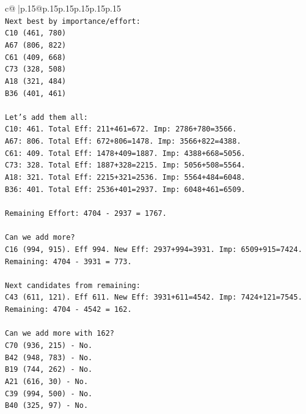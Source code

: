 \documentclass{article}
\begin{document}
{\begin{supertabular}{c@{$\;$}|p{.15\linewidth}@{}p{.15\linewidth}p{.15\linewidth}p{.15\linewidth}p{.15\linewidth}p{.15\linewidth}}
{{{\\ 
\texttt{Next best by importance/effort:} \\
\texttt{C10 (461, 780)} \\
\texttt{A67 (806, 822)} \\
\texttt{C61 (409, 668)} \\
\texttt{C73 (328, 508)} \\
\texttt{A18 (321, 484)} \\
\texttt{B36 (401, 461)} \\
\\ 
\texttt{Let's add them all:} \\
\texttt{C10: 461. Total Eff: 211+461=672. Imp: 2786+780=3566.} \\
\texttt{A67: 806. Total Eff: 672+806=1478. Imp: 3566+822=4388.} \\
\texttt{C61: 409. Total Eff: 1478+409=1887. Imp: 4388+668=5056.} \\
\texttt{C73: 328. Total Eff: 1887+328=2215. Imp: 5056+508=5564.} \\
\texttt{A18: 321. Total Eff: 2215+321=2536. Imp: 5564+484=6048.} \\
\texttt{B36: 401. Total Eff: 2536+401=2937. Imp: 6048+461=6509.} \\
\\ 
\texttt{Remaining Effort: 4704 {-} 2937 = 1767.} \\
\\ 
\texttt{Can we add more?} \\
\texttt{C16 (994, 915). Eff 994. New Eff: 2937+994=3931. Imp: 6509+915=7424.} \\
\texttt{Remaining: 4704 {-} 3931 = 773.} \\
\\ 
\texttt{Next candidates from remaining:} \\
\texttt{C43 (611, 121). Eff 611. New Eff: 3931+611=4542. Imp: 7424+121=7545.} \\
\texttt{Remaining: 4704 {-} 4542 = 162.} \\
\\ 
\texttt{Can we add more with 162?} \\
\texttt{C70 (936, 215) {-} No.} \\
\texttt{B42 (948, 783) {-} No.} \\
\texttt{B19 (744, 262) {-} No.} \\
\texttt{A21 (616, 30) {-} No.} \\
\texttt{C39 (994, 500) {-} No.} \\
\texttt{B40 (325, 97) {-} No.} \\
}}}
\end{supertabular}}
\end{document}
